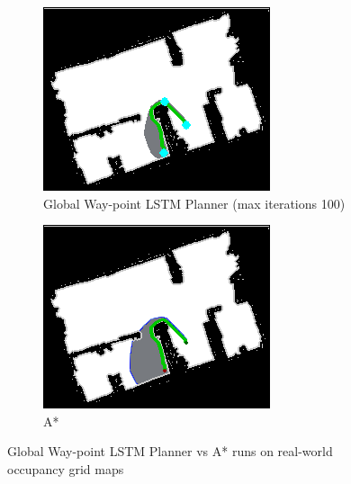 \begin{figure}[]
\begin{subfigure}[b]{0.38\linewidth}
    \includegraphics[width=\linewidth]{images/screenshot_147.png}
     \caption{Global Way-point LSTM Planner (max iterations 100)}
  \end{subfigure}
  \hfill
  \begin{subfigure}[b]{0.38\linewidth}
    \includegraphics[width=\linewidth]{images/screenshot_146.png}
     \caption{A*\newline}
  \end{subfigure}
  \caption{Global Way-point LSTM Planner vs A* runs on real-world occupancy grid maps \cite{second_map}}
  \label{fig: wp_vs_a_2}
\end{figure}


